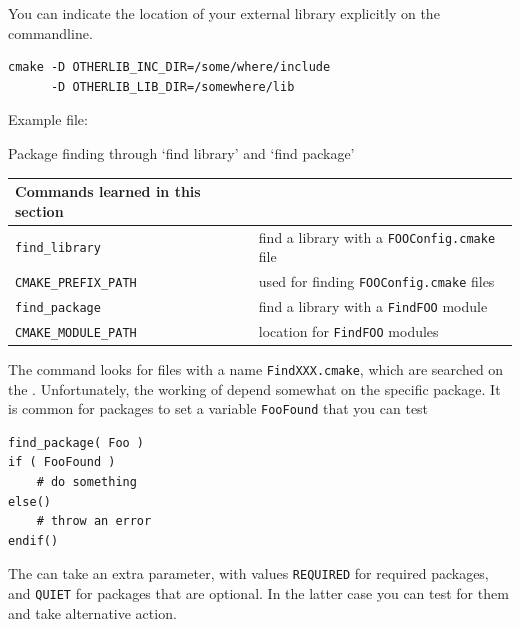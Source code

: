You can indicate the location of your external library explicitly on the commandline.

\begin{lstlisting}
cmake -D OTHERLIB_INC_DIR=/some/where/include
      -D OTHERLIB_LIB_DIR=/somewhere/lib
\end{lstlisting}

Example  file:
%


 {Package finding through `find library' and `find package'}


\begin{tabular}{lp{3in}}
  \toprule
  Commands learned in this section\\
  \midrule
  \lstinline+find_library+&find a library with a \lstinline+FOOConfig.cmake+ file\\
  \lstinline+CMAKE_PREFIX_PATH+&used for finding \lstinline+FOOConfig.cmake+ files\\
  \lstinline+find_package+&find a library with a \lstinline+FindFOO+ module\\
  \lstinline+CMAKE_MODULE_PATH+&location for \lstinline+FindFOO+ modules\\
  \bottomrule
\end{tabular}

The  command looks for files with
a name \lstinline[language=shell]{FindXXX.cmake}, which are searched
on the .
Unfortunately, the working of 
depend somewhat on the specific package.
It is common for packages to set a variable \lstinline{FooFound}
that you can test
\begin{lstlisting}
find_package( Foo )
if ( FooFound )
    # do something
else()
    # throw an error
endif()
\end{lstlisting}
The  can take an extra parameter, with values
\lstinline{REQUIRED} for required packages, and
\lstinline{QUIET} for packages that are optional.
In the latter case you can test for them and take alternative action.

